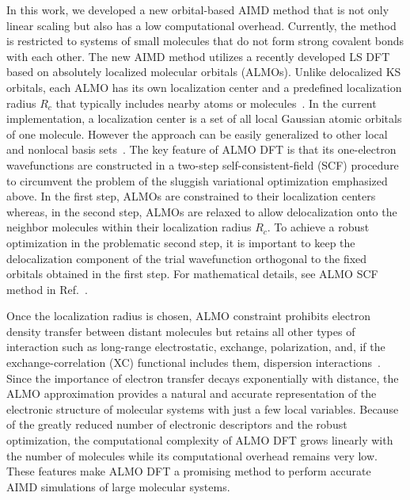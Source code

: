 \documentclass[aps,prl,reprint,amsmath,amssymb]{revtex4-1}
\begin{document}
In this work, we developed a new orbital-based AIMD method that is not only linear scaling but also has a low computational overhead. 
Currently, the method is restricted to systems of small molecules that do not form strong covalent bonds with each other. 
The new AIMD method utilizes a recently developed LS DFT~\cite{a:almo-ls} based on absolutely localized molecular orbitals (\mbox{ALMOs}). 
Unlike delocalized KS orbitals, each \mbox{ALMO} has its own localization center and a predefined localization radius $R_{c}$ that typically includes nearby atoms or molecules~\cite{a:stoll,a:almo-ls}. 
In the current implementation, a localization center is a set of all local Gaussian atomic orbitals of one molecule. 
However the approach can be easily generalized to other local and nonlocal basis sets~\cite{a:ls-galli-parrinello-1992, Galerkin}. 
The key feature of ALMO DFT is that its one-electron wavefunctions are constructed in a two-step self-consistent-field (SCF) procedure~\cite{a:almo-ls} to circumvent the problem of the sluggish variational optimization emphasized above. 
In the first step, ALMOs are constrained to their localization centers~\cite{a:khal} whereas, in the second step, ALMOs are relaxed to allow delocalization onto the neighbor molecules within their localization radius $R_{c}$. 
To achieve a robust optimization in the problematic second step, it is important to keep the delocalization component of the trial wavefunction orthogonal to the fixed orbitals obtained in the first step. 
For mathematical details, see ALMO SCF method in Ref.~.

Once the localization radius is chosen, ALMO constraint prohibits electron density transfer between distant molecules but retains all other types of interaction such as long-range electrostatic, exchange, polarization, and, if the exchange-correlation (XC) functional includes them, dispersion interactions~\cite{a:theeda}. 
Since the importance of electron transfer decays exponentially with distance, the \mbox{ALMO} approximation provides a natural and accurate representation of the electronic structure of molecular systems with just a few local variables. 
Because of the greatly reduced number of electronic descriptors and the robust optimization, the computational complexity of ALMO DFT grows linearly with the number of molecules while its computational overhead remains very low. These features make ALMO DFT a promising method to perform accurate AIMD simulations of large molecular systems.

\end{document}
